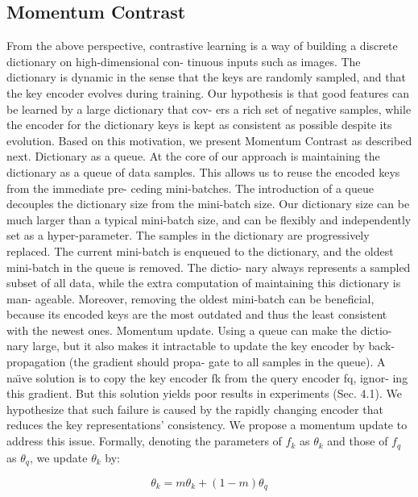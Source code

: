 \documentclass[10pt,twocolumn]{article}  %
\begin{document}
\subsection{Momentum Contrast}
\hspace{1em} From the above perspective, contrastive learning is a way
of building a discrete dictionary on high-dimensional con-
tinuous inputs such as images. The dictionary is dynamic in
the sense that the keys are randomly sampled, and that the
key encoder evolves during training. Our hypothesis is that
good features can be learned by a large dictionary that cov-
ers a rich set of negative samples, while the encoder for the
dictionary keys is kept as consistent as possible despite its
evolution. Based on this motivation, we present Momentum
Contrast as described next.
Dictionary as a queue. At the core of our approach is
maintaining the dictionary as a queue of data samples. This
allows us to reuse the encoded keys from the immediate pre-
ceding mini-batches. The introduction of a queue decouples
the dictionary size from the mini-batch size. Our dictionary
size can be much larger than a typical mini-batch size, and
can be flexibly and independently set as a hyper-parameter.
The samples in the dictionary are progressively replaced.
The current mini-batch is enqueued to the dictionary, and
the oldest mini-batch in the queue is removed. The dictio-
nary always represents a sampled subset of all data, while
the extra computation of maintaining this dictionary is man-
ageable. Moreover, removing the oldest mini-batch can be
beneficial, because its encoded keys are the most outdated
and thus the least consistent with the newest ones.
Momentum update. Using a queue can make the dictio-
nary large, but it also makes it intractable to update the key
encoder by back-propagation (the gradient should propa-
gate to all samples in the queue). A na\"{\i}ve solution is to
copy the key encoder fk from the query encoder fq, ignor-
ing this gradient. But this solution yields poor results in
experiments (Sec. 4.1). We hypothesize that such failure
is caused by the rapidly changing encoder that reduces the
key representations' consistency. We propose a momentum
update to address this issue.
Formally, denoting the parameters of $f_k$ as $\theta_k$ and those
of $f_q$ as $\theta_q$, we update $\theta_k$ by:

\begin{equation}
    \theta_k = m \theta_k + (1-m) \theta_q
    \label{eq:equation2}
\end{equation}
\end{document}
